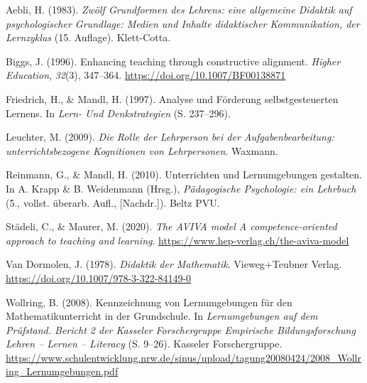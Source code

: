 \documentclass[
  10pt,
  a4paper,
  DIV=11]{scrartcl}
\newlength{\cslhangindent}
\newenvironment{CSLReferences}[2] %
 {\begin{list}{}{%
  \setlength{\itemindent}{0pt}
  \setlength{\leftmargin}{0pt}
  \setlength{\parsep}{0pt}
  \ifodd #1
   \setlength{\leftmargin}{\cslhangindent}
   \setlength{\itemindent}{-1\cslhangindent}
  \fi
  \setlength{\itemsep}{#2\baselineskip}}}
 {\end{list}}
\begin{document}
\label{refs}
\begin{CSLReferences}{1}{0}
Aebli, H. (1983). \emph{Zwölf Grundformen des Lehrens: eine allgemeine
Didaktik auf psychologischer Grundlage: Medien und Inhalte didaktischer
Kommunikation, der Lernzyklus} (15. Auflage). Klett-Cotta.

Biggs, J. (1996). Enhancing teaching through constructive alignment.
\emph{Higher Education}, \emph{32}(3), 347--364.
\url{https://doi.org/10.1007/BF00138871}

Friedrich, H., \& Mandl, H. (1997). Analyse und Förderung
selbstgesteuerten Lernens. In \emph{Lern- Und Denkstrategien} (S.
237--296).

Leuchter, M. (2009). \emph{Die Rolle der Lehrperson bei der
Aufgabenbearbeitung: unterrichtsbezogene Kognitionen von Lehrpersonen}.
Waxmann.

Reinmann, G., \& Mandl, H. (2010). Unterrichten und Lernumgebungen
gestalten. In A. Krapp \& B. Weidenmann (Hrsg.), \emph{Pädagogische
Psychologie: ein Lehrbuch} (5., vollst. überarb. Aufl., {[}Nachdr.{]}).
Beltz {PVU}.

Städeli, C., \& Maurer, M. (2020). \emph{The {AVIVA} model A
competence-oriented approach to teaching and learning}.
\url{https://www.hep-verlag.ch/the-aviva-model}

Van Dormolen, J. (1978). \emph{Didaktik der Mathematik}. Vieweg+Teubner
Verlag. \url{https://doi.org/10.1007/978-3-322-84149-0}

Wollring, B. (2008). Kennzeichnung von Lernumgebungen für den
Mathematikunterricht in der Grundschule. In \emph{Lernumgebungen auf dem
Prüfstand. Bericht 2 der Kasseler Forschergruppe Empirische
Bildungsforschung Lehren -- Lernen -- Literacy} (S. 9--26). Kasseler
Forschergruppe.
\url{https://www.schulentwicklung.nrw.de/sinus/upload/tagung20080424/2008_Wollring_Lernumgebungen.pdf}

\end{CSLReferences}
\end{document}
